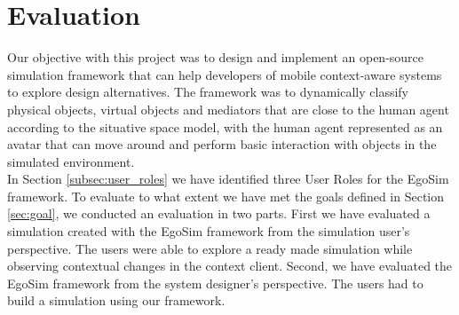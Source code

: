\chapter{Evaluation}\label{ch:evaluation}
Our objective with this project was to design and implement an open-source simulation framework that can help developers of mobile context-aware systems to explore design alternatives. The framework was to dynamically classify physical objects, virtual objects and mediators that are close to the human agent according to the situative space model, with the human agent represented as an avatar that can move around and perform basic interaction with objects in the simulated environment.\\

In Section \ref{subsec:user_roles} we have identified three User Roles for the EgoSim framework. To evaluate to what extent we have met the goals defined in Section \ref{sec:goal}, we conducted an evaluation in two parts. First we have evaluated a simulation created with the EgoSim framework from the simulation user's perspective. The users were able to explore a ready made simulation while observing contextual changes in the context client. Second, we have evaluated the EgoSim framework from the system designer's perspective. The users had to build a simulation using our framework.\\




